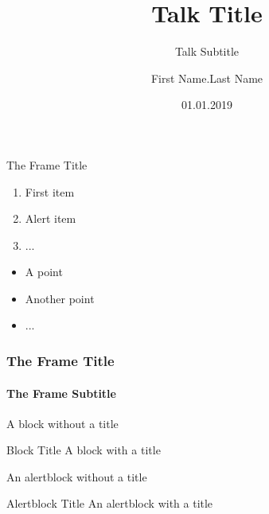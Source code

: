 \documentclass[14pt]{beamer}
\title[Small Title]{Talk Title}
\subtitle{Talk Subtitle}
\author[First Name]{First Name.Last Name}
\institute[Inst]{Institute}
\date{01.01.2019}
\begin{document}
\maketitle

\begin{frame}{The Frame Title}

  \begin{enumerate}
    \item First item
    \item \alert{Alert item}
    \item ...
  \end{enumerate}

  \vfill

  \begin{itemize}
    \item A point
    \item Another point
    \item ...
  \end{itemize}
  
\end{frame}

\begin{frame}
  \frametitle{The Frame Title}
  \framesubtitle{The Frame Subtitle}

  \begin{block}{}
    A block without a title
  \end{block}

  \begin{block}{Block Title}
    A block with a title
  \end{block}
  
  \begin{alertblock}{}
    An alertblock without a title
  \end{alertblock}

  \begin{alertblock}{Alertblock Title}
    An alertblock with a title
  \end{alertblock}

\end{frame}
\end{document}
